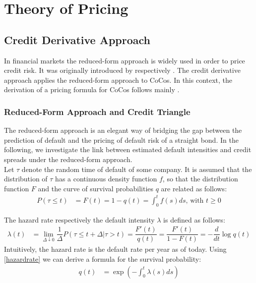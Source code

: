 \chapter{Theory of Pricing}

\section{Credit Derivative Approach}

In financial markets the reduced-form approach is widely used in order to price credit risk. It was originally introduced by \citet{jarrow1995pricing} respectively \citet{duffie1999modeling}. The credit derivative approach applies the reduced-form approach to CoCos. In this context, the derivation of a pricing formula for CoCos follows mainly \citet{de2011pricing}. 

\subsection{Reduced-Form Approach and Credit Triangle}

The reduced-form approach is an elegant way of bridging the gap between the prediction of default and the pricing of default risk of a straight bond. In the following, we investigate the link between estimated default intensities and credit spreads under the reduced-form approach. \citep{lando2009credit}\\

Let $\tau$ denote the random time of default of some company. It is assumed that the distribution of $\tau$ has a continuous density function $f$, so that the distribution function $F$ and the curve of survival probabilities $q$ are related as follows:  
\begin{align}
P(\tau \leq t) &= F(t) = 1 - q(t) = \int_0^t f(s) ds \text{, with } t \geq 0
\end{align}

The hazard rate respectively the default intensity $\lambda$ is defined as follows:
\begin{align} \label{hazardrate}
\lambda(t) &= \lim_{\Delta \downarrow 0} \dfrac{1}{\Delta} P(\tau \leq t + \Delta | \tau > t) = \dfrac{F'(t)}{q(t)} = \dfrac{F'(t)}{1 - F(t)} = - \dfrac{d}{dt} \log q(t)
\end{align}
Intuitively, the hazard rate is the default rate per year as of today. Using \ref{hazardrate} we can derive a formula for the survival probability:
\begin{align}
q(t) &= \exp \left(- \int_0^t \lambda (s) ds \right)
\end{align}

